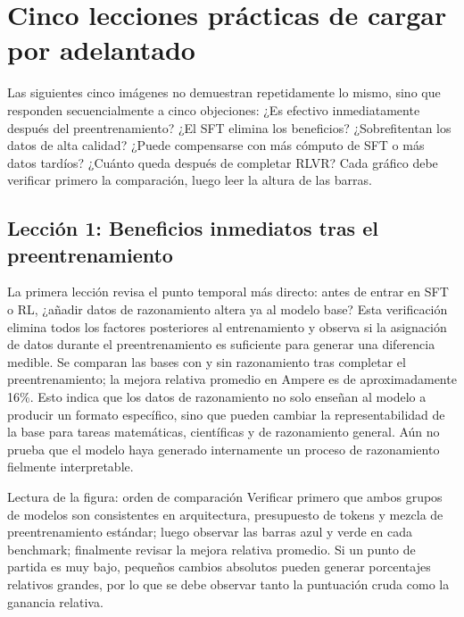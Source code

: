 \section{Cinco lecciones prácticas de cargar por adelantado}

Las siguientes cinco imágenes no demuestran repetidamente lo mismo, sino que responden secuencialmente a cinco objeciones: ¿Es efectivo inmediatamente después del preentrenamiento? ¿El SFT elimina los beneficios? ¿Sobrefitentan los datos de alta calidad? ¿Puede compensarse con más cómputo de SFT o más datos tardíos? ¿Cuánto queda después de completar RLVR? Cada gráfico debe verificar primero la comparación, luego leer la altura de las barras.

\subsection{Lección 1: Beneficios inmediatos tras el preentrenamiento}

La primera lección revisa el punto temporal más directo: antes de entrar en SFT o RL, ¿añadir datos de razonamiento altera ya al modelo base? Esta verificación elimina todos los factores posteriores al entrenamiento y observa si la asignación de datos durante el preentrenamiento es suficiente para generar una diferencia medible. Se comparan las bases con y sin razonamiento tras completar el preentrenamiento; la mejora relativa promedio en Ampere es de aproximadamente 16\%. Esto indica que los datos de razonamiento no solo enseñan al modelo a producir un formato específico, sino que pueden cambiar la representabilidad de la base para tareas matemáticas, científicas y de razonamiento general. Aún no prueba que el modelo haya generado internamente un proceso de razonamiento fielmente interpretable.


\begin{knowledgebox}{Lectura de la figura: orden de comparación}
Verificar primero que ambos grupos de modelos son consistentes en arquitectura, presupuesto de tokens y mezcla de preentrenamiento estándar; luego observar las barras azul y verde en cada benchmark; finalmente revisar la mejora relativa promedio. Si un punto de partida es muy bajo, pequeños cambios absolutos pueden generar porcentajes relativos grandes, por lo que se debe observar tanto la puntuación cruda como la ganancia relativa.
\end{knowledgebox}

